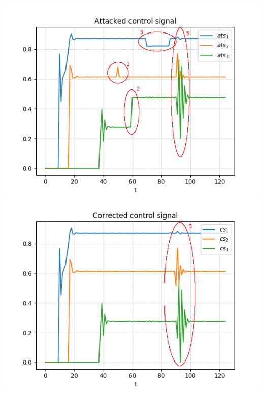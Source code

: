 \documentclass{tikzposter}
\begin{document}
{\begin{minipage}[t]{\linewidth}
		\end{minipage}
%
%
%
		\begin{minipage}[t]{\linewidth}
			\centering
			\includegraphics[height=10cm]{./Images/attacked_signal_improved.png}
			\includegraphics[height=10cm]{./Images/control_signal_improved.png}

\end{minipage}}
\end{document}
